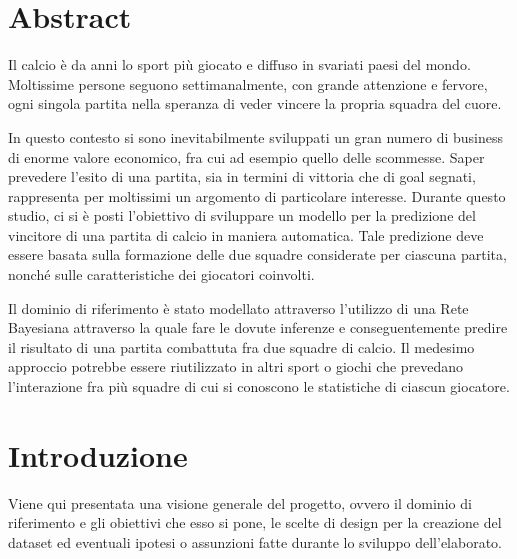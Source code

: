 \documentclass[hidelinks, 12pt]{article}
\begin{document}


\null{}
\section*{\centering Abstract}

Il calcio è da anni lo sport più giocato e diffuso in svariati paesi del mondo. Moltissime persone seguono settimanalmente, con grande attenzione e fervore, ogni singola partita nella speranza di veder vincere la propria squadra del cuore.

In questo contesto si sono inevitabilmente sviluppati un gran numero di business di enorme valore economico, fra cui ad esempio quello delle scommesse. Saper prevedere l'esito di una partita, sia in termini di vittoria che di goal segnati, rappresenta per moltissimi un argomento di particolare interesse. Durante questo studio, ci si è posti l'obiettivo di sviluppare un modello per la predizione del vincitore di una partita di calcio in maniera automatica. Tale predizione deve essere basata sulla formazione delle due squadre considerate per ciascuna partita, nonché sulle caratteristiche dei giocatori coinvolti.

Il dominio di riferimento è stato modellato attraverso l'utilizzo di una Rete Bayesiana attraverso la quale fare le dovute inferenze e conseguentemente predire il risultato di una partita combattuta fra due squadre di calcio. Il medesimo approccio potrebbe essere riutilizzato in altri sport o giochi che prevedano l'interazione fra più squadre di cui si conoscono le statistiche di ciascun giocatore.
 \null

\clearpage



\tableofcontents
\clearpage
\listoffigures
\listoftables
\pagebreak




\section{Introduzione}

Viene qui presentata una visione generale del progetto, ovvero il dominio di riferimento e gli obiettivi che esso si pone, le scelte di design per la creazione del dataset ed eventuali ipotesi o assunzioni fatte durante lo sviluppo dell'elaborato.
\end{document}
